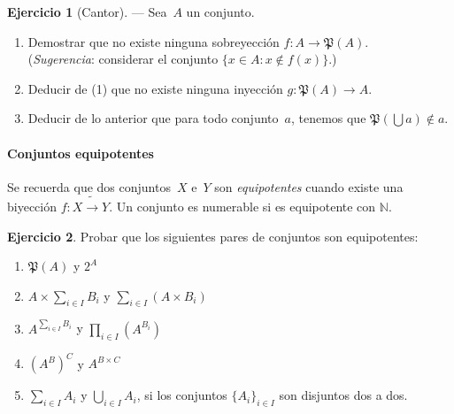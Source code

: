 \documentclass[a4paper,12pt]{book}
\newcommand{\N}{\mathbb{N}}
\def\Pow{\mathfrak{P}}
\def\inonto{\mathbin{\tilde{\to}}}
\def\Pow{\mathfrak{P}}
\def\inonto{\mathbin{\tilde{\to}}}
\theoremstyle{definition}
\newtheorem{ejercicio}{Ejercicio}
\begin{document}
	\begin{ejercicio}[Cantor]\label{ejer:Cantor}
		--- Sea~$A$ un conjunto.
		\begin{enumerate}
			\item[(1)] Demostrar que no existe ninguna sobreyección
			$f:A\to\Pow(A)$.\\
			(\textit{Sugerencia}: considerar el conjunto
			$\{x\in A:x\notin f(x)\}$.)
			\item[(2)] Deducir de (1) que no existe ninguna inyección
			$g:\Pow(A)\to A$.
			\item[(3)] Deducir de lo anterior que para todo conjunto~$a$,
			tenemos que $\Pow(\bigcup a)\notin a$.
		\end{enumerate}
	\end{ejercicio}
	
	
	\paragraph{Conjuntos equipotentes}
	Se recuerda que dos conjuntos~$X$ e~$Y$ son \emph{equipotentes} cuando
	existe una biyección $f:X\inonto Y$. Un conjunto es numerable si es equipotente con $\N$.
	
	\begin{ejercicio}
		Probar que los siguientes pares de conjuntos son equipotentes:
		\begin{enumerate}\parskip-.5ex
			\item $\Pow(A)$ y $2^A$
			\item $A\times \sum_{i\in I}B_i$ y $\sum_{i\in I}(A\times B_i)$
			\item $A^ {\sum_{i\in I}B_i}$ y $\prod_{i\in I}(A^ {B_i})$
			\item $(A^B)^C$ y $A^{B\times C}$
			\item $\sum_{i\in I}A_i$ y $\bigcup_{i\in I}A_i$, si los conjuntos $\{A_i\}_{i\in I}$ son disjuntos dos a dos.
		\end{enumerate}
	\end{ejercicio}
	
\end{document}
